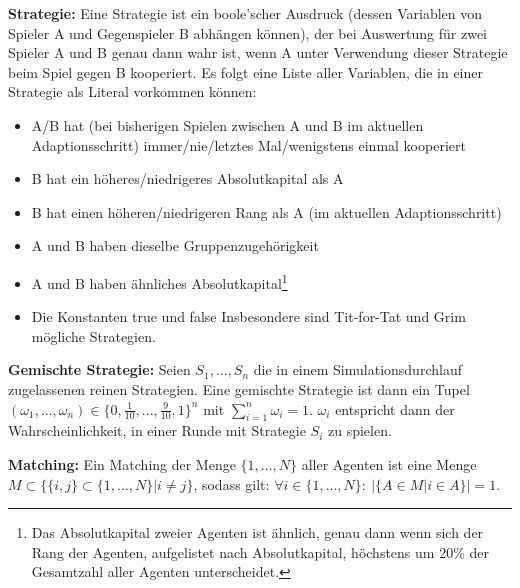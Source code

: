 \documentclass[parskip=full,11pt]{scrartcl}
\def\adapt{Adaptionsschritt}
\begin{document}
\textbf{Strategie:}
Eine Strategie ist ein boole'scher Ausdruck (dessen Variablen von Spieler A und Gegenspieler B abhängen können), der bei Auswertung für zwei Spieler A und B genau dann wahr ist, wenn A unter Verwendung dieser Strategie beim Spiel gegen B kooperiert. Es folgt eine Liste aller Variablen, die in einer Strategie als Literal vorkommen können:
\begin{itemize}
\item A/B hat (bei bisherigen Spielen zwischen A und B im aktuellen \adapt) immer/nie/letztes Mal/wenigstens einmal kooperiert
\item B hat ein höheres/niedrigeres Absolutkapital als A
\item B hat einen höheren/niedrigeren Rang als A (im aktuellen \adapt)
\item A und B haben dieselbe Gruppenzugehörigkeit
\item A und B haben ähnliches Absolutkapital\footnote{Das Absolutkapital zweier Agenten ist ähnlich, genau dann wenn sich der Rang der Agenten, aufgelistet nach Absolutkapital, höchstens um \(20\%\) der Gesamtzahl aller Agenten unterscheidet.}
\item Die Konstanten true und false
Insbesondere sind Tit-for-Tat und Grim mögliche Strategien.
\end{itemize}

\textbf{Gemischte Strategie:}
Seien \(S_1,...,S_n\) die in einem Simulationsdurchlauf zugelassenen reinen Strategien. Eine gemischte Strategie ist dann ein Tupel \((\omega_1,...,\omega_n) \in \{0,\frac{1}{10},...,\frac{9}{10},1\}^n\) mit \(\sum_{i=1}^n \omega_i = 1\). \(\omega_i\) entspricht dann der Wahrscheinlichkeit, in einer Runde mit Strategie \(S_i\) zu spielen.

\textbf{Matching:}
Ein Matching der Menge \(\{1,...,N\}\) aller Agenten ist eine Menge \(M \subset \{\{i,j\} \subset \{1,...,N\} | i \neq j\}\), sodass gilt: \(\forall i \in \{1,...,N\}: \ |\{A \in M | i \in A\}| = 1\).
\end{document}
